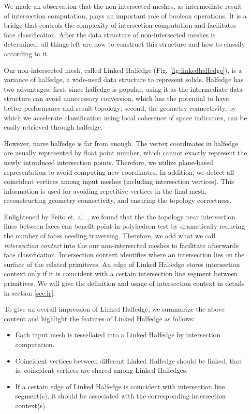 \documentclass[10pt,journal,compsoc]{IEEEtran}
\begin{document}
\label{sec:meshes}
We made an observation that the non-intersected meshes, as intermediate result of intersection computation, plays an important role of boolean operations. It is a bridge that controls the complexity of intersection computation and facilitates face classification. After the data structure of non-intersected meshes is determined, all things left are how to construct this structure and how to classify according to it.

Our non-intersected mesh, called Linked Halfedge (Fig. \ref{fig:linkedhalfedge}), is a variance of halfedge, a wide-used data structure to represent solids. Halfedge has two advantages: first, since halfedge is popular, using it as the intermediate data structure can avoid unnecessary conversion, which has the potential to have better performance and result topology; second, the geometry connectivity, by which we accelerate classification using local coherence of space indicators, can be easily retrieved through halfedge.

However, naive halfedge is far from enough. The vertex coordinates in halfedge are usually represented by float point number, which cannot exactly represent the newly introduced intersection points. Therefore, we utilize plane-based representation to avoid computing new coordinates. In addition, we detect all coincident vertices among input meshes (including intersection vertices). This information is used for avoiding repetitive vertices in the final mesh, reconstructing geometry connectivity, and ensuring the topology correctness.

Enlightened by Feito et. al. \cite{feito2013fast}, we found that the the topology near intersection lines between faces can benefit point-in-polyhedron test by dramatically reducing the number of faces needing traversing. Therefore, we add what we call \emph{intersection context} into the our non-intersected meshes to facilitate afterwards face classification. Intersection context identifies where an intersection lies on the surface of the related primitives. An edge of Linked Halfedge stores intersection context only if it is coincident with a certain intersection line segment between primitives. We will give the definition and usage of intersection context in details in section \ref{sec:ir}.

To give an overall impression of Linked Halfedge, we summarize the above content and highlight the features of Linked Halfedge as follows:

\begin{itemize}
  \item Each input mesh is tessellated into a Linked Halfedge by intersection computation.
  \item Coincident vertices between different Linked Halfedge should be linked, that is, coincident vertices are shared among Linked Halfedges.
  \item If a certain edge of Linked Halfedge is coincident with intersection line segment(s), it should be associated with the corresponding intersection context(s).
\end{itemize}
\end{document}
